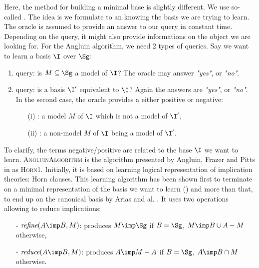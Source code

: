 Here, the method for building a minimal base is slightly different. We use 
so-called . The idea is we formulate 
to an  knowing the basis we are trying to learn. The oracle 
is assumed to provide an answer to our query in constant time. Depending on 
the query, it might also provide informations on the object we are looking for.
For the Angluin algorithm, we need 2 types of queries. Say we want to learn
a basis $\I$ over $\Sg$:
\begin{enumerate}
	\item {} query: is $M \subseteq \Sg$ a model of $\I$? The
	oracle may answer \textit{"yes"}, or \textit{"no"}.
	\item {} query: is a basis $\I'$ equivalent to $\I$? Again
	the answers are \textit{"yes"}, or \textit{"no"}. In the second case, the oracle provides a	 either positive or negative:
	\begin{itemize}
		\item[(i)] : a model $M$ of $\I$ which is not a
		model of $\I'$,
		\item[(ii)] : a non-model $M$ of $\I$ being a model
		of $\I'$. 
	\end{itemize}
\end{enumerate}
\noindent To clarify, the terms negative/positive are related to the base $\I$
we want to learn. \textsc{AngluinAlgorithm} is the algorithm presented by Angluin, Frazer and Pitts in \cite{angluin_learning_1992} as \textsc{Horn1}. 
Initially, it is based on learning logical representation of implication theories: Horn clauses. This learning algorithm has been shown first to terminate on a minimal representation of the basis we want to learn (\cite{angluin_learning_1992}) and more than that, to end up on the canonical
basis by Arias and al. \cite{arias_canonical_2009}. It uses two operations allowing to reduce implications:
\begin{itemize}
	\item[-] $\textit{refine}(A \imp B, M)$: produces $M \imp \Sg$ if $B = \Sg$, $M \imp B \cup A - M$ otherwise,
	\item[-] $\textit{reduce}(A \imp B, M)$: produces $A \imp M - A$ if $B = \Sg$, $A \imp B \cap M$ otherwise.
\end{itemize}

